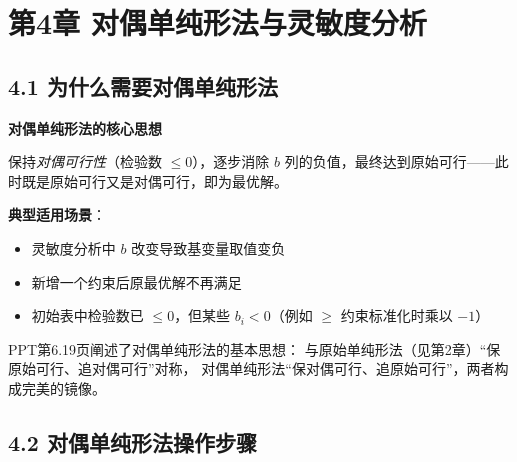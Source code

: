 \section{第4章 \quad 对偶单纯形法与灵敏度分析}

\subsection{4.1 为什么需要对偶单纯形法}

%

\begin{defbox}
\textbf{对偶单纯形法的核心思想}

保持\emph{对偶可行性}（检验数 $\le 0$），逐步消除 $b$ 列的负值，最终达到原始可行——此时既是原始可行又是对偶可行，即为最优解。

\textbf{典型适用场景}：
\begin{itemize}
  \item 灵敏度分析中 $b$ 改变导致基变量取值变负
  \item 新增一个约束后原最优解不再满足
  \item 初始表中检验数已 $\le 0$，但某些 $b_i < 0$（例如 $\ge$ 约束标准化时乘以 $-1$）
\end{itemize}
\end{defbox}

\medskip
PPT第6.19页阐述了对偶单纯形法的基本思想：
与原始单纯形法（见第2章）“保原始可行、追对偶可行”对称，
对偶单纯形法“保对偶可行、追原始可行”，两者构成完美的镜像。
\medskip

\subsection{4.2 对偶单纯形法操作步骤}

